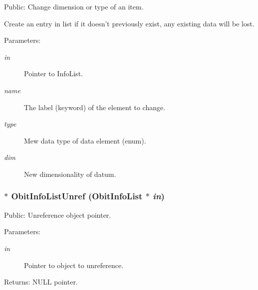 Public: Change dimension or type of an item. 

Create an entry in list if it doesn't previously exist, any existing data will be lost. \begin{Desc}
\item[Parameters:]
\begin{description}
\item[{\em in}]Pointer to Info\-List. \item[{\em name}]The label (keyword) of the element to change. \item[{\em type}]Mew data type of data element (enum). \item[{\em dim}]New dimensionality of datum. \end{description}
\end{Desc}
\subsubsection{$\ast$ Obit\-Info\-List\-Unref ({\bf Obit\-Info\-List} $\ast$ {\em in})}\label{ObitInfoList_8c_a6}


Public: Unreference object pointer. 

\begin{Desc}
\item[Parameters:]
\begin{description}
\item[{\em in}]Pointer to object to unreference. \end{description}
\end{Desc}
\begin{Desc}
\item[Returns:]NULL pointer. \end{Desc}
